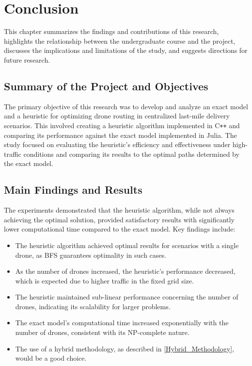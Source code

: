 \chapter{Conclusion}
\label{Conclusion}
This chapter summarizes the findings and contributions of this research, highlights the relationship between the undergraduate course and the project, discusses the implications and limitations of the study, and suggests directions for future research.

\section{Summary of the Project and Objectives}
The primary objective of this research was to develop and analyze an exact model and a heuristic for optimizing drone routing in centralized last-mile delivery scenarios. This involved creating a heuristic algorithm implemented in C\texttt{++} and comparing its performance against the exact model implemented in Julia. The study focused on evaluating the heuristic's efficiency and effectiveness under high-traffic conditions and comparing its results to the optimal paths determined by the exact model.

\section{Main Findings and Results}
The experiments demonstrated that the heuristic algorithm, while not always achieving the optimal solution, provided satisfactory results with significantly lower computational time compared to the exact model. Key findings include:
\begin{itemize}
    \item The heuristic algorithm achieved optimal results for scenarios with a single drone, as BFS guarantees optimality in such cases.
    \item As the number of drones increased, the heuristic's performance decreased, which is expected due to higher traffic in the fixed grid size.
    \item The heuristic maintained sub-linear performance concerning the number of drones, indicating its scalability for larger problems.
    \item The exact model's computational time increased exponentially with the number of drones, consistent with its NP-complete nature.
    \item The use of a hybrid methodology, as described in \ref{Hybrid_Methodology}, would be a good choice.
\end{itemize}

